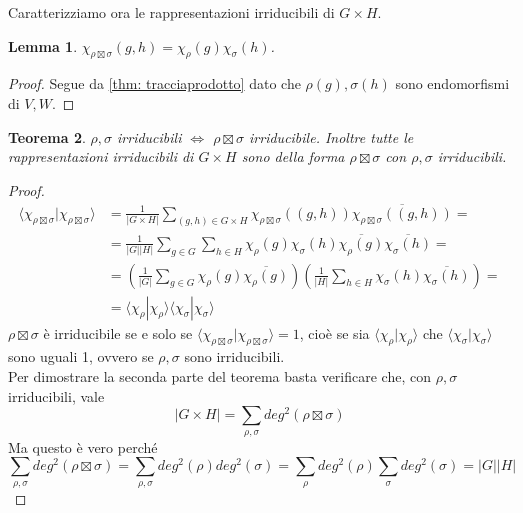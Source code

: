 \documentclass[11pt]{article}
\theoremstyle{plain}
\newtheorem{thm}{Teorema}[section]
\newtheorem{lemma}[thm]{Lemma}
\theoremstyle{definition}
\theoremstyle{remark}
\begin{document}
$ $\\
Caratterizziamo ora le rappresentazioni irriducibili di $G\times H$.
\begin{lemma}
	$\chi_{\rho\boxtimes\sigma}(g, h)=\chi_\rho(g) \chi_\sigma(h)$.
\end{lemma}
\begin{proof}
	Segue da \ref{thm: tracciaprodotto} dato che $\rho(g), \sigma(h)$ sono endomorfismi di $V, W$.
\end{proof}
\begin{thm}
	\label{thm: prodotto irriducibili}
	$\rho, \sigma$ irriducibili $\iff$ $\rho\boxtimes\sigma$ irriducibile. Inoltre tutte le rappresentazioni irriducibili di $G\times H$ sono della forma $\rho\boxtimes\sigma$ con $\rho, \sigma$ irriducibili.
\end{thm}
\begin{proof}
	\begin{align*}
	\langle \chi_{\rho\boxtimes\sigma} | \chi_{\rho\boxtimes\sigma} \rangle &= \frac{1}{|G\times H|}\sum_{(g, h)\in G\times H}\chi_{\rho\boxtimes\sigma}((g, h))\overline{\chi_{\rho\boxtimes\sigma}((g, h))} = \\
	&= \frac{1}{|G||H|}\sum_{g\in G}\sum_{h\in H}\chi_{\rho}(g)\chi_{\sigma}(h)\overline{\chi_{\rho}(g)}\overline{\chi_{\sigma}(h)} = \\
	&= \left(\frac{1}{|G|}\sum_{g\in G}\chi_{\rho}(g)\overline{\chi_{\rho}(g)}\right) \left(\frac{1}{|H|}\sum_{h\in H}\chi_{\sigma}(h)\overline{\chi_{\sigma}(h)}\right)= \\
	&= \langle \chi_{\rho} | \chi_{\rho} \rangle \langle \chi_{\sigma} | \chi_{\sigma} \rangle
	\end{align*}
	$\rho\boxtimes\sigma$ è irriducibile se e solo se $\langle \chi_{\rho\boxtimes\sigma} | \chi_{\rho\boxtimes\sigma} \rangle = 1$, cioè se sia $\langle \chi_{\rho} | \chi_{\rho} \rangle$ che $\langle \chi_{\sigma} | \chi_{\sigma} \rangle$ sono uguali 1, ovvero se $\rho, \sigma$ sono irriducibili.\\
	Per dimostrare la seconda parte del teorema basta verificare che, con $\rho, \sigma$ irriducibili, vale
	\[|G\times H| = \sum_{\rho, \sigma} deg^2(\rho\boxtimes\sigma)\]
	Ma questo è vero perché
	\[\sum_{\rho, \sigma} deg^2(\rho\boxtimes\sigma) = \sum_{\rho, \sigma} deg^2(\rho) deg^2(\sigma) = \sum_{\rho} deg^2(\rho) \sum_{\sigma} deg^2(\sigma) = |G||H|\]
\end{proof}
\end{document}
